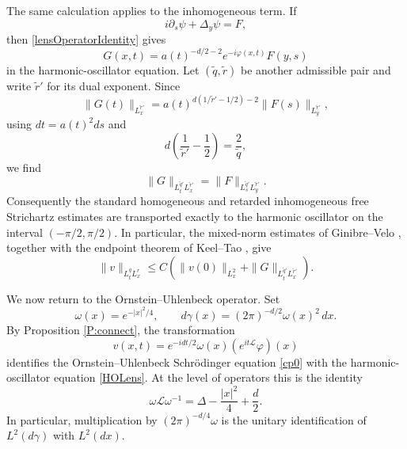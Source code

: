 \documentclass[11pt,a4paper]{amsart}
\def \phi {\varphi}
\def \vf{\varphi}
\newcommand{\p}{\partial}
\numberwithin{equation}{section}
\numberwithin{equation}{section}
\begin{document}
The same calculation applies to the inhomogeneous term.  If
\[
 i\p_s\psi+\Delta_y\psi=F,
\]
then \eqref{lensOperatorIdentity} gives
\[
 G(x,t)=a(t)^{-d/2-2}e^{-i\phi(x,t)}F(y,s)
\]
in the harmonic-oscillator equation.  Let $(\widetilde q,\widetilde r)$ be another admissible pair and write $\widetilde r'$ for its dual exponent.  Since
\[
 \|G(t)\|_{L^{\widetilde r'}_x}
 =a(t)^{d(1/\widetilde r'-1/2)-2}
   \|F(s)\|_{L^{\widetilde r'}_y},
\]
using $dt=a(t)^2ds$ and
\[
 d\left(\frac1{\widetilde r'}-\frac12\right)=\frac2{\widetilde q},
\]
we find
\begin{equation}\label{forcingLensNorm}
 \|G\|_{L^{\widetilde q'}_tL^{\widetilde r'}_x}
 =\|F\|_{L^{\widetilde q'}_sL^{\widetilde r'}_y}.
\end{equation}
Consequently the standard homogeneous and retarded inhomogeneous free Strichartz estimates are transported exactly to the harmonic oscillator on the interval $(-\pi/2,\pi/2)$.  In particular, the mixed-norm estimates of Ginibre--Velo \cite{GV}, together with the endpoint theorem of Keel--Tao \cite{KT}, give
\begin{equation}\label{HOstrichartz}
 \|v\|_{L^q_tL^r_x}
 \le C\left(\|v(0)\|_{L^2_x}
 +\|G\|_{L^{\widetilde q'}_tL^{\widetilde r'}_x}\right).
\end{equation}

We now return to the Ornstein--Uhlenbeck operator.  Set
\begin{equation}\label{omegaOU}
 \omega(x)=e^{-|x|^2/4},
 \qquad
 d\gamma(x)=(2\pi)^{-d/2}\omega(x)^2\,dx.
\end{equation}
By Proposition \ref{P:connect}, the transformation
\begin{equation}\label{OUtoHOlens}
 v(x,t)=e^{-idt/2}\omega(x)\left(e^{it\mathscr L}\vf\right)(x)
\end{equation}
identifies the Ornstein--Uhlenbeck Schr\"odinger equation \eqref{cp0} with the harmonic-oscillator equation \eqref{HOLens}.  At the level of operators this is the identity
\begin{equation}\label{OUHOoperator}
 \omega\mathscr L\omega^{-1}
 =\Delta-\frac{|x|^2}{4}+\frac d2.
\end{equation}
In particular, multiplication by $(2\pi)^{-d/4}\omega$ is the unitary identification of $L^2(d\gamma)$ with $L^2(dx)$.
\end{document}
